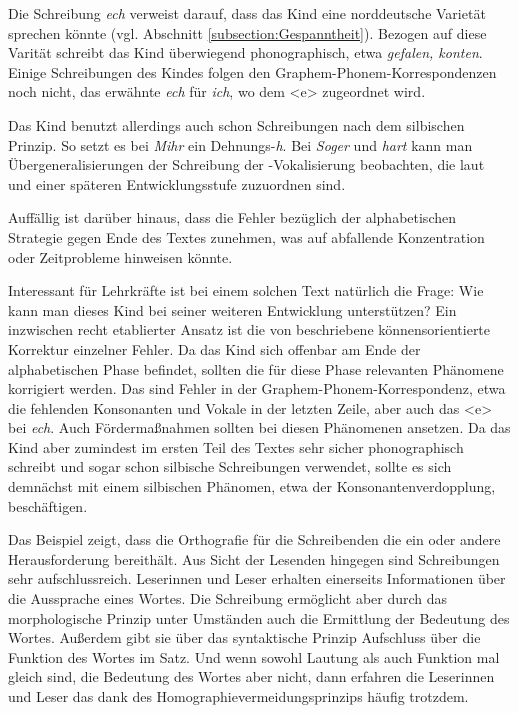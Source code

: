 Die Schreibung \textit{ech} verweist darauf, dass das Kind eine norddeutsche Varietät sprechen könnte (vgl. Abschnitt \ref{subsection:Gespanntheit}). Bezogen auf diese Varität schreibt das Kind überwiegend phonographisch, etwa \textit{gefalen, konten}. Einige Schreibungen des Kindes folgen den Graphem-Phonem-Korrespondenzen noch nicht, \zB das erwähnte \textit{ech} für \textit{ich}, wo \textipa{[I]} dem <e> zugeordnet wird. 

Das Kind benutzt allerdings auch schon Schreibungen nach dem silbischen Prinzip. So setzt es bei \textit{Mihr} ein Dehnungs-\textit{h}. Bei \textit{Soger} und \textit{hart} kann man Übergeneralisierungen der Schreibung der -Vokalisierung beobachten, die laut \citet{Thome2006} und \citet{Thome2019} einer späteren Entwicklungsstufe zuzuordnen sind.

Auffällig ist darüber hinaus, dass die Fehler bezüglich der alphabetischen Strategie gegen Ende des Textes zunehmen, was auf abfallende Konzentration oder Zeitprobleme hinweisen könnte.

Interessant für Lehrkräfte ist bei einem solchen Text natürlich die Frage: Wie kann man dieses Kind bei seiner weiteren Entwicklung unterstützen? Ein inzwischen recht etablierter Ansatz ist die von \citet[183]{SchruenderLenzen2013} beschriebene könnensorientierte Korrektur einzelner Fehler. Da das Kind sich offenbar am Ende der alphabetischen Phase befindet, sollten die für diese Phase relevanten Phänomene korrigiert werden. Das sind Fehler in der Graphem-Phonem-Korrespondenz, etwa die fehlenden Konsonanten und Vokale in der letzten Zeile, aber auch das <e> bei \textit{ech}. Auch Fördermaßnahmen sollten bei diesen Phänomenen ansetzen. Da das Kind aber zumindest im ersten Teil des Textes sehr sicher phonographisch schreibt und sogar schon silbische Schreibungen verwendet, sollte es sich demnächst mit einem silbischen Phänomen, etwa der Konsonantenverdopplung, beschäftigen. 

Das Beispiel zeigt, dass die Orthografie für die Schreibenden die ein oder andere Herausforderung bereithält. Aus Sicht der Lesenden hingegen sind Schreibungen sehr aufschlussreich. Leserinnen und Leser erhalten einerseits Informationen über die Aussprache eines Wortes. Die Schreibung ermöglicht aber durch das morphologische Prinzip unter Umständen auch die Ermittlung der Bedeutung des Wortes. Außerdem gibt sie über das syntaktische Prinzip Aufschluss über die Funktion des Wortes im Satz. Und wenn sowohl Lautung als auch Funktion mal gleich sind, die Bedeutung des Wortes aber nicht, dann erfahren die Leserinnen und Leser das dank des Homographievermeidungsprinzips häufig trotzdem.

